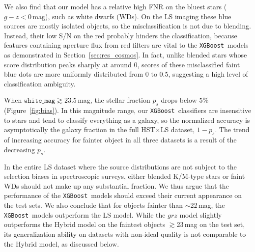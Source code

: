 \documentclass[twocolumn,tighten]{aastex631}
\newcommand{\xgboost}{\texttt{XGBoost}}
\begin{document}
\begin{CJK*}{UTF8}{gbsn}
We also find that our model has a relative high FNR on the bluest stars ($g-z<0$\,mag), such as white dwarfs (WDs). On the LS imaging these blue sources are mostly isolated objects, so the misclassification is not due to blending. Instead, their low S/N on the red probably hinders the classification, because features containing aperture flux from red filters are vital to the \xgboost\ models as demonstrated in Section~\ref{sec:res_cosmos}. In fact, unlike blended stars whose score distribution peaks sharply at around 0, scores of these misclassified faint blue dots are more uniformly distributed from 0 to 0.5, suggesting a high level of classification ambiguity. 

When $\texttt{white\_mag}\gtrsim 23.5$\,mag, the stellar fraction $p_s$ drops below 5\% (Figure~\ref{fig:bias}). In this magnitude range, our \xgboost\ classifiers are insensitive to stars and tend to classify everything as a galaxy, so the normalized accuracy is asymptotically the galaxy fraction in the full HST$\times$LS dataset, $1-p_s$. The trend of increasing accuracy for fainter object in all three datasets is a result of the decreasing $p_s$.

In the entire LS dataset where the source distributions are not subject to the selection biases in spectroscopic surveys, either blended K/M-type stars or faint WDs should not make up any substantial fraction. We thus argue that the performance of the \xgboost\ models should exceed their current appearance on the test sets. We also conclude that for objects fainter than $\sim$22\,mag, the \xgboost\ models outperform the LS model. While the $grz$ model slightly outperforms the Hybrid model on the faintest objects $\gtrsim$23\,mag on the test set, its generalization ability on datasets with non-ideal quality is not comparable to the Hybrid model, as discussed below.


\end{CJK*}
\end{document}
